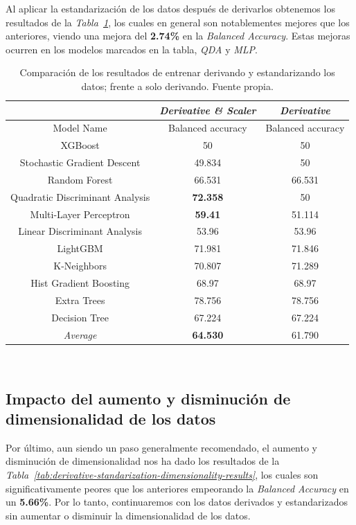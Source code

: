 Al aplicar la estandarización de los datos después de derivarlos obtenemos los resultados de la \textit{Tabla\ \ref{tab:derivative-standarization-results}}, los cuales en general son notablementes mejores que los anteriores, viendo una mejora del \textbf{2.74\%} en la \textit{Balanced Accuracy}. Estas mejoras ocurren en los modelos marcados en la tabla, \textit{QDA} y \textit{MLP}.


\begin{table}[!h]
    \centering
    \begin{tabular}{|c|c|c|}
        \hline
        & \textit{Derivative \& Scaler} & \textit{Derivative} \\ \hline
        Model Name & Balanced accuracy & Balanced accuracy \\ \hline
        XGBoost & 50 & 50 \\
        Stochastic Gradient Descent & 49.834 & 50 \\ 
        Random Forest & 66.531 & 66.531 \\ 
        Quadratic Discriminant Analysis & \textbf{72.358} & 50 \\ 
        Multi-Layer Perceptron & \textbf{59.41} & 51.114 \\ 
        Linear Discriminant Analysis & 53.96 & 53.96 \\ 
        LightGBM & 71.981 & 71.846 \\ 
        K-Neighbors & 70.807 & 71.289 \\ 
        Hist Gradient Boosting & 68.97 & 68.97 \\ 
        Extra Trees & 78.756 & 78.756 \\ 
        Decision Tree & 67.224 & 67.224 \\ \hline
        \textit{Average} & \textbf{64.530} & 61.790 \\ \hline
    \end{tabular}
    \caption{Comparación de los resultados de entrenar derivando y estandarizando los datos; frente a solo derivando. Fuente propia.}\ \label{tab:derivative-standarization-results}
\end{table}


\subsection{Impacto del aumento y disminución de dimensionalidad de los datos}


Por último, aun siendo un paso generalmente recomendado, el aumento y disminución de dimensionalidad nos ha dado los resultados de la \textit{Tabla\ \ref{tab:derivative-standarization-dimensionality-results}}, los cuales son significativamente peores que los anteriores empeorando la \textit{Balanced Accuracy} en un \textbf{5.66\%}. Por lo tanto, continuaremos con los datos derivados y estandarizados sin aumentar o disminuir la dimensionalidad de los datos.

